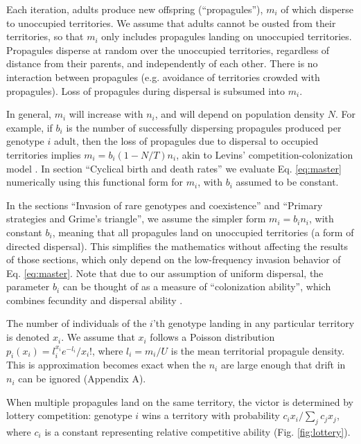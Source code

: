 \documentclass[11pt]{article}
\begin{document}
Each iteration, adults produce new offspring (``propagules''), $m_i$ of which disperse to unoccupied territories. We assume that adults cannot be ousted from their territories, so that $m_i$ only includes propagules landing on unoccupied territories. Propagules disperse at random over the unoccupied territories, regardless of distance from their parents, and independently of each other. There is no interaction between propagules (e.g. avoidance of territories crowded with propagules). Loss of propagules during dispersal is subsumed into $m_i$. 

In general, $m_i$ will increase with $n_i$, and will depend on population density $N$. For example, if $b_i$ is the number of successfully dispersing propagules produced per genotype $i$ adult, then the loss of propagules due to dispersal to occupied territories implies $m_i=b_i(1-N/T)n_i$, akin to Levins' competition-colonization model \citep{levins_71,tilman_94}. In section ``Cyclical birth and death rates'' we evaluate Eq. \eqref{eq:master} numerically using this functional form for $m_i$, with $b_i$ assumed to be constant. 

In the sections ``Invasion of rare genotypes and coexistence'' and ``Primary strategies and Grime's triangle'', we assume the simpler form $m_i=b_i n_i$, with constant $b_i$, meaning that all propagules land on unoccupied territories (a form of directed dispersal). This simplifies the mathematics without affecting the results of those sections, which only depend on the low-frequency invasion behavior of Eq. \eqref{eq:master}. Note that due to our assumption of uniform dispersal, the parameter $b_i$ can be thought of as a measure of ``colonization ability'', which combines fecundity and dispersal ability \citep{levins_71,tilman_94,bolker_99}. 

The number of individuals of the $i$'th genotype landing in any particular territory is denoted $x_i$. We assume that $x_i$ follows a Poisson distribution $p_i(x_i)=l_i^{x_i} e^{-l_i}/x_i!$, where $l_i=m_i/U$ is the mean territorial propagule density. This is approximation becomes exact when the $n_i$ are large enough that drift in $n_i$ can be ignored (Appendix A).

When multiple propagules land on the same territory, the victor is determined by lottery competition: genotype $i$ wins a territory with probability $c_i x_i/\sum_j c_j x_j$, where $c_i$ is a constant representing relative competitive ability (Fig. \ref{fig:lottery}). 
\end{document}
